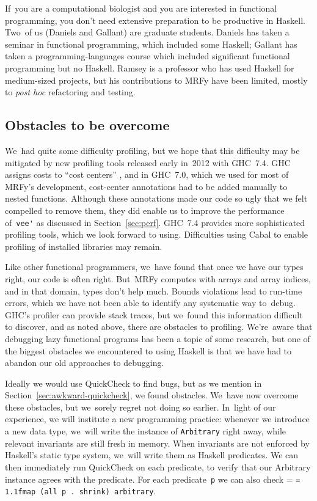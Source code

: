 \documentclass[]{jfp1}
\makeatletter
\newcommand\secref[1]{Section~\ref{sec:#1}}
\newcommand{\mono}[1]{%
  {\@tempdima = \fontdimen2\font
   \texttt{\spaceskip = 1.1\@tempdima #1}}}
\let\cite\citep
\makeatother
\begin{document}
If~you are a computational biologist and you are interested in
functional programming, you don't need extensive preparation
to be productive in Haskell.
Two~of us (Daniels and Gallant) are graduate students.
Daniels has taken a seminar in functional programming, which
included some Haskell;
Gallant has taken a programming-languages course which included
significant functional programming but no Haskell.
Ramsey is a professor who has used Haskell 
for medium-sized projects,
but his contributions to MRFy have been limited, mostly to \emph{post hoc}
refactoring and testing.


\subsection{Obstacles to be overcome}

We~had quite some difficulty profiling, but we hope that
this difficulty may be mitigated by new profiling tools released early
in~2012 with
GHC~7.4.
GHC assigns costs to ``cost centers'' \cite{sansom-pj},
and
in GHC~7.0, which we used 
for most of MRFy's development, 
cost-center annotations had to be added manually
to nested functions.
Although these annotations
made our code so ugly that we felt compelled to
remove them, they did enable us to improve the performance of~\verb+vee'+ as
discussed in \secref{perf}.
GHC~7.4 provides 
more sophisticated profiling tools, which we look forward to using.
Difficulties using Cabal to enable profiling of installed libraries
may remain.

Like other functional programmers, we~have found that 
once we have our types right, our code is often right.
But~MRFy computes with arrays and array indices,
and in that domain, types don't help much.
Bounds violations lead to run-time errors, which we have not been able
to identify any systematic way to~debug.
GHC's profiler can provide stack traces, but we~found this information
difficult to discover, and as noted above,
there are obstacles to profiling.
We're~aware that debugging lazy functional programs has been a topic
of some research,
but one of the biggest obstacles we encountered to using Haskell is
that we have had to abandon our old approaches to debugging.

Ideally we would use QuickCheck to find bugs, but as we mention in
\secref{awkward-quickcheck}, we found obstacles.
We~have now overcome these obstacles, but
we~sorely regret not doing so earlier.
In~light of our experience, we will institute a new programming practice:
whenever we introduce a new data type,
we~will write the instance of
\texttt{Arbitrary} right away, while
relevant invariants are still fresh in memory.
When invariants are not enforced by Haskell's static type system,
we~will write them as Haskell predicates.
We can then immediately run QuickCheck on each predicate, to verify
that our Arbitrary instance agrees with the predicate.
For each predicate~\texttt{p} we can also check
\mono{fmap (all p . shrink) arbitrary}.
\end{document}
